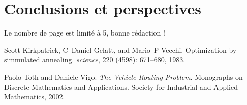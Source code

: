 \documentclass{costic}
\begin{document}
	\section{Conclusions et perspectives}
	
	Le nombre de page est limité à 5,  bonne rédaction !
	
	
	
	
	
	
	\begin{thebibliography}{2}
		
		Scott Kirkpatrick, C~Daniel Gelatt, and Mario~P Vecchi.
		\newblock Optimization by simmulated annealing.
		\newblock \emph{science}, 220 (4598): 671--680, 1983.
		
		Paolo Toth and Daniele Vigo.
		\newblock \emph{The Vehicle Routing Problem}.
		\newblock Monographs on Discrete Mathematics and Applications. Society for Industrial and Applied Mathematics, 2002.
		
		
	\end{thebibliography}
	
	
\end{document}

